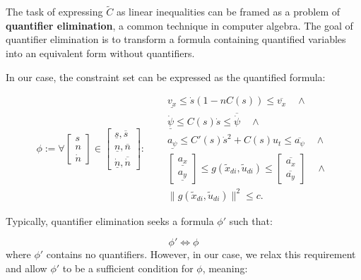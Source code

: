 The task of expressing $\tilde{C}$ as linear inequalities can be framed as a problem of \textbf{quantifier elimination}, a common technique in
computer algebra.
The goal of quantifier elimination is to transform a formula containing quantified variables into an equivalent form without quantifiers.

In our case, the constraint set can be expressed as the quantified formula:

\begin{equation}
	\label{eq:forall_formula}
	\phi :=
	\forall
	\begin{bmatrix}
		s \\
		n \\
		\dot{n}
	\end{bmatrix} \in
	\begin{bmatrix}
		\underline{s}, \overline{s} \\
		\underline{n}, \overline{n} \\
		\underline{\dot{n}}, \overline{\dot{n}}
	\end{bmatrix}: \quad
	\begin{aligned}
		 & \underline{v_x} \leq \dot{s}(1-nC(s)) \leq \overline{v_x} \quad \land                         \\
		 & \underline{\dot{\psi}} \leq C(s)\dot{s} \leq \overline{\dot{\psi}} \quad \land                \\
		 & \underline{a_{\psi}} \leq C'(s)\dot{s}^2 + C(s)u_t \leq \overline{a_{\psi}} \quad \land       \\
		 & \begin{bmatrix}
			   \underline{a_x} \\[2mm] \underline{a_y}
		   \end{bmatrix} \leq g(\tilde{x}_{di},\tilde{u}_{di}) \leq \begin{bmatrix}
			                                                            \overline{a_x} \\[2mm] \overline{a_y}
		                                                            \end{bmatrix} \quad \land \\
		 & \|g(\tilde{x}_{di}, \tilde{u}_{di})\|^2 \leq c.
	\end{aligned}
\end{equation}

Typically, quantifier elimination seeks a formula $\phi'$ such that:

\[ \phi' \iff \phi \] where $\phi'$ contains no quantifiers.
However, in our case, we relax this requirement and allow $\phi'$ to be a sufficient condition for $\phi$, meaning:

